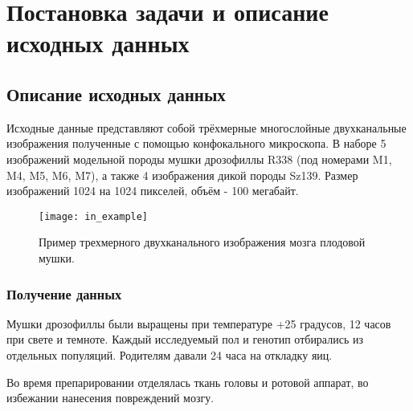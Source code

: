 \chapter{Постановка задачи и описание исходных данных} \label{ch1}


%
%


\section{Описание исходных данных} \label{ch1:sec2} 


Исходные данные представляют собой трёхмерные многослойные двухканальные изображения полученные с помощью конфокального микроскопа. В наборе 5 изображений модельной породы мушки дрозофиллы R338 (под номерами M1, M4, M5, M6, M7), а также 4 изображения дикой породы Sz139. Размер изображений 1024 на 1024 пикселей, объём - 100 мегабайт.

\begin{figure}[H]
	\centering
	\texttt{[image: in\_example]}
	\caption{Пример трехмерного двухканального изображения мозга плодовой мушки.}
	\label{in_example}
\end{figure}

\subsection{Получение данных}
Мушки дрозофиллы были выращены при температуре +25 градусов, 12 часов при свете и темноте. 
Каждый исследуемый пол и генотип отбирались из отдельных популяций. Родителям давали 24 часа на откладку яиц.

Во время препарировании отделялась ткань головы и ротовой аппарат, во избежании нанесения повреждений мозгу.


